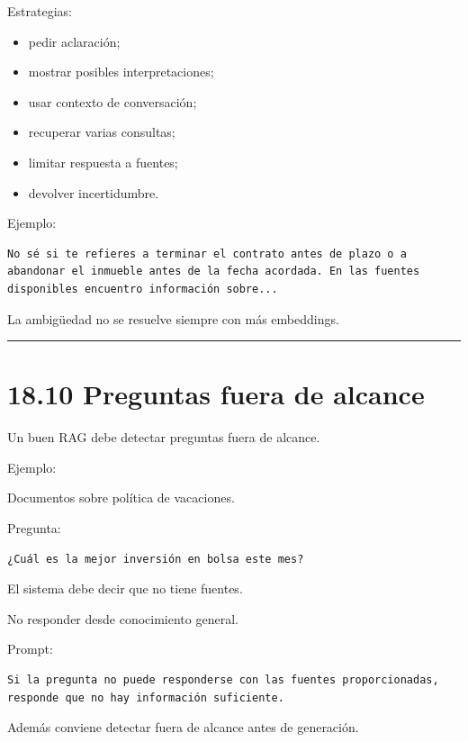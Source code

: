 Estrategias:

\begin{itemize}
\tightlist
\item
  pedir aclaración;
\item
  mostrar posibles interpretaciones;
\item
  usar contexto de conversación;
\item
  recuperar varias consultas;
\item
  limitar respuesta a fuentes;
\item
  devolver incertidumbre.
\end{itemize}

Ejemplo:

\begin{lstlisting}
No sé si te refieres a terminar el contrato antes de plazo o a abandonar el inmueble antes de la fecha acordada. En las fuentes disponibles encuentro información sobre...
\end{lstlisting}

La ambigüedad no se resuelve siempre con más embeddings.

\begin{center}\rule{0.5\linewidth}{0.5pt}\end{center}

\section{18.10 Preguntas fuera de
alcance}\label{preguntas-fuera-de-alcance}

Un buen RAG debe detectar preguntas fuera de alcance.

Ejemplo:

Documentos sobre política de vacaciones.

Pregunta:

\begin{lstlisting}
¿Cuál es la mejor inversión en bolsa este mes?
\end{lstlisting}

El sistema debe decir que no tiene fuentes.

No responder desde conocimiento general.

Prompt:

\begin{lstlisting}
Si la pregunta no puede responderse con las fuentes proporcionadas, responde que no hay información suficiente.
\end{lstlisting}

Además conviene detectar fuera de alcance antes de generación.


